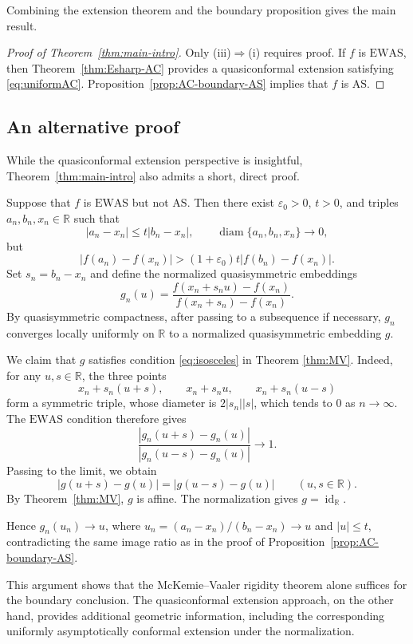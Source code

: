 \documentclass[10pt,a4paper]{amsart}
\numberwithin{equation}{section}
\begin{document}
Combining the extension theorem and the boundary proposition gives the main
result.


\begin{proof}[Proof of Theorem~\ref{thm:main-intro}]
Only (iii)$\Rightarrow$(i) requires proof.  
If $f$ is $\mathrm{EWAS}$, then Theorem~\ref{thm:Esharp-AC} provides a quasiconformal extension satisfying
\eqref{eq:uniformAC}.  
Proposition~\ref{prop:AC-boundary-AS} implies that $f$ is $\mathrm{AS}$.
\end{proof}



\subsection{An alternative proof}
While the quasiconformal extension perspective is insightful, Theorem~\ref{thm:main-intro} also admits a short, direct proof. 

Suppose that $f$ is $\mathrm{EWAS}$ but not $\mathrm{AS}$.  
Then there exist $\varepsilon_0>0$, $t>0$, and triples $a_n,b_n,x_n\in\mathbb R$ such that
\[
|a_n-x_n|\leq t|b_n-x_n|,\qquad\operatorname{diam}\{a_n,b_n,x_n\}\to 0,
\]
but
\[
|f(a_n)-f(x_n)|
>(1+\varepsilon_0)t|f(b_n)-f(x_n)|.
\]
Set $s_n=b_n-x_n$ and define the normalized quasisymmetric embeddings
\[
g_n(u)=\frac{f(x_n+s_nu)-f(x_n)}{f(x_n+s_n)-f(x_n)}.
\]
By quasisymmetric compactness, after passing to a subsequence if necessary, $g_n$ converges locally uniformly on $\mathbb R$ to a normalized quasisymmetric embedding $g$.

We claim that $g$ satisfies condition \eqref{eq:isosceles} in Theorem \ref{thm:MV}.  
Indeed, for any $u,s\in\mathbb R$, the three points
\[
x_n+s_n(u+s),\qquad x_n+s_nu,\qquad x_n+s_n(u-s)
\]
form a symmetric triple, whose diameter is $2|s_n||s|$, which tends to $0$ as $n \to \infty$.  
The $\mathrm{EWAS}$ condition therefore gives
\[
\frac{|g_n(u+s)-g_n(u)|}{|g_n(u-s)-g_n(u)|}\to 1.
\]
Passing to the limit, we obtain
\[
|g(u+s)-g(u)|=|g(u-s)-g(u)|\qquad(u,s\in\mathbb R).
\]
By Theorem~\ref{thm:MV}, $g$ is affine.  
The normalization gives $g=\operatorname{id}_{\mathbb R}$.

Hence $g_n(u_n)\to u$, where $u_n=(a_n-x_n)/(b_n-x_n)\to u$ and $|u|\leq t$, contradicting the same image ratio as in the proof of Proposition~\ref{prop:AC-boundary-AS}.

This argument shows that the McKemie--Vaaler rigidity theorem alone
suffices for the boundary conclusion. The quasiconformal extension approach, on the other hand, provides additional geometric information, including the corresponding uniformly asymptotically conformal extension under the normalization.
\end{document}
